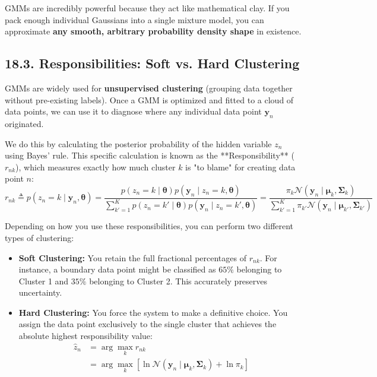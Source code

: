 \documentclass{article}
\begin{document}
GMMs are incredibly powerful because they act like mathematical clay. If you pack enough individual Gaussians into a single mixture model, you can approximate \textbf{any smooth, arbitrary probability density shape} in existence.

\subsection*{18.3. Responsibilities: Soft vs. Hard Clustering}
GMMs are widely used for \textbf{unsupervised clustering} (grouping data together without pre-existing labels). Once a GMM is optimized and fitted to a cloud of data points, we can use it to diagnose where any individual data point $\mathbf{y}_n$ originated.

We do this by calculating the posterior probability of the hidden variable $z_n$ using Bayes' rule. This specific calculation is known as the **Responsibility** ($r_{nk}$), which measures exactly how much cluster $k$ is "to blame" for creating data point $n$:
\begin{equation}
r_{nk} \triangleq p(z_n = k \mid \mathbf{y}_n, \boldsymbol{\theta}) = \frac{p(z_n = k \mid \boldsymbol{\theta}) p(\mathbf{y}_n \mid z_n = k, \boldsymbol{\theta})}{\sum_{k'=1}^K p(z_n = k' \mid \boldsymbol{\theta}) p(\mathbf{y}_n \mid z_n = k', \boldsymbol{\theta})} = \frac{\pi_k \mathcal{N}(\mathbf{y}_n \mid \boldsymbol{\mu}_k, \boldsymbol{\Sigma}_k)}{\sum_{k'=1}^K \pi_{k'} \mathcal{N}(\mathbf{y}_n \mid \boldsymbol{\mu}_{k'}, \boldsymbol{\Sigma}_{k'})} \tag{116}
\end{equation}

Depending on how you use these responsibilities, you can perform two different types of clustering:
\begin{itemize}
    \item \textbf{Soft Clustering:} You retain the full fractional percentages of $r_{nk}$. For instance, a boundary data point might be classified as $65\%$ belonging to Cluster 1 and $35\%$ belonging to Cluster 2. This accurately preserves uncertainty.
    \item \textbf{Hard Clustering:} You force the system to make a definitive choice. You assign the data point exclusively to the single cluster that achieves the absolute highest responsibility value:
    \begin{align}
    \hat{z}_n &= \arg\max_k r_{nk} \nonumber \\
    &= \arg\max_k \left[ \ln \mathcal{N}(\mathbf{y}_n \mid \boldsymbol{\mu}_k, \boldsymbol{\Sigma}_k) + \ln \pi_k \right] \tag{117}
    \end{align}
\end{itemize}
\end{document}
